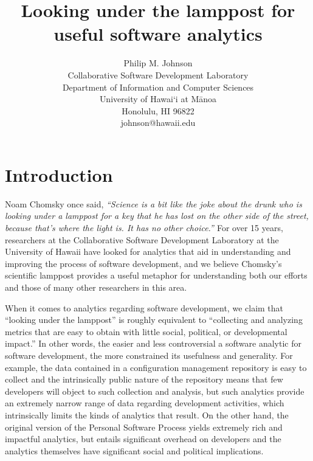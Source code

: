 \documentclass[]{article}
\begin{document}


\title{{\bf Looking under the lamppost for useful software analytics}} 

\author{Philip M. Johnson\\
        Collaborative Software Development Laboratory\\
        Department of Information and Computer Sciences\\
        University of Hawai`i at M\=anoa\\
        Honolulu, HI 96822\\
        johnson@hawaii.edu\\
}


\maketitle

\thispagestyle{empty}


\setlength{\parskip}{3pt plus 1pt minus 1pt} 

\section{Introduction}
Noam Chomsky once said, {\em ``Science is a bit like the joke about the drunk who is
  looking under a lamppost for a key that he has lost on the other side of the street,
  because that's where the light is. It has no other choice.'' \cite{Barsky98}} For over
15 years, researchers at the Collaborative Software Development Laboratory at the
University of Hawaii have looked for analytics that aid in understanding and
improving the process of software development, and we believe Chomsky's scientific
lamppost provides a useful metaphor for understanding both our efforts and those of many
other researchers in this area.

When it comes to analytics regarding software development, we claim that
``looking under the lamppost'' is roughly equivalent to ``collecting and analyzing metrics
that are easy to obtain with little social, political, or developmental impact.''  In
other words, the easier and less controversial a software analytic for software
development, the more constrained its usefulness and generality.  For example, the data
contained in a configuration management repository is easy to collect and the
intrinsically public nature of the repository means that few developers will object to
such collection and analysis, but such analytics provide an extremely narrow range of data
regarding development activities, which intrinsically limits the kinds of analytics that
result.  On the other hand, the original version of the Personal Software Process yields
extremely rich and impactful analytics, but entails significant overhead on developers and
the analytics themselves have significant social and political implications.
\end{document}
